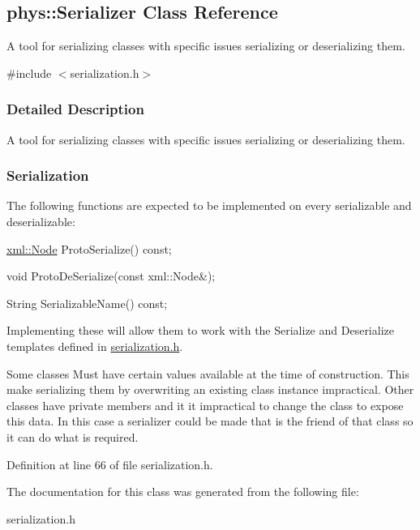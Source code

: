 \hypertarget{classphys_1_1Serializer}{
\subsection{phys::Serializer Class Reference}
\label{d2/d4f/classphys_1_1Serializer}
}


A tool for serializing classes with specific issues serializing or deserializing them.  




{\ttfamily \#include $<$serialization.h$>$}



\subsubsection{Detailed Description}
A tool for serializing classes with specific issues serializing or deserializing them. \hypertarget{d2/d4f/classphys_1_1Serializer_Serialization}{}\subsubsection{Serialization}\label{d2/d4f/classphys_1_1Serializer_Serialization}
The following functions are expected to be implemented on every serializable and deserializable:\par
 \hyperlink{classphys_1_1xml_1_1Node}{xml::Node} ProtoSerialize() const; \par
 void ProtoDeSerialize(const xml::Node\&); \par
 String SerializableName() const; \par
 Implementing these will allow them to work with the Serialize and Deserialize templates defined in \hyperlink{serialization_8h_source}{serialization.h}.

Some classes Must have certain values available at the time of construction. This make serializing them by overwriting an existing class instance impractical. Other classes have private members and it it impractical to change the class to expose this data. In this case a serializer could be made that is the friend of that class so it can do what is required. 

Definition at line 66 of file serialization.h.



The documentation for this class was generated from the following file:\begin{DoxyCompactItemize}
\item 
serialization.h\end{DoxyCompactItemize}
